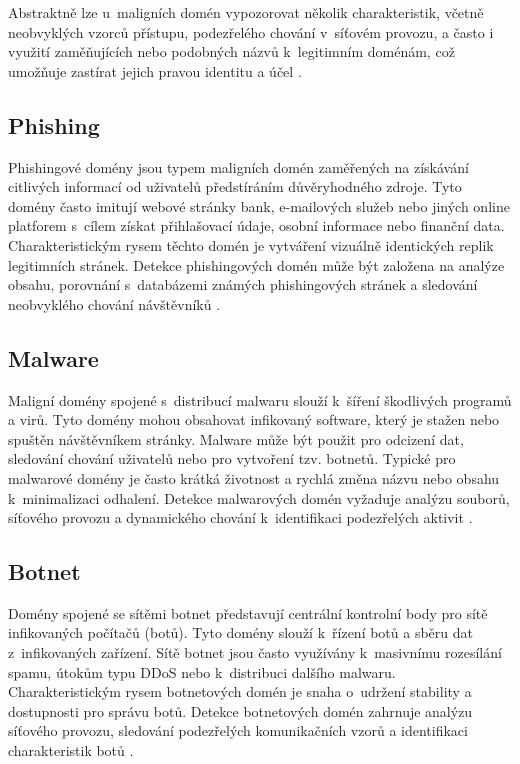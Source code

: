 Abstraktně lze u~maligních domén vypozorovat několik charakteristik, včetně neobvyklých vzorců přístupu, podezřelého chování v~síťovém provozu, a často i využití zaměňujících nebo podobných názvů k~legitimním doménám, což umožňuje zastírat jejich pravou identitu a účel \cite{perdisci2009detection}.



\subsection{Phishing}
Phishingové domény jsou typem maligních domén zaměřených na získávání citlivých informací od uživatelů předstíráním důvěryhodného zdroje. Tyto domény často imitují webové stránky bank, e-mailových služeb nebo jiných online platforem s~cílem získat přihlašovací údaje, osobní informace nebo finanční data. Charakteristickým rysem těchto domén je vytváření vizuálně identických replik legitimních stránek. Detekce phishingových domén může být založena na analýze obsahu, porovnání s~databázemi známých phishingových stránek a sledování neobvyklého chování návštěvníků \cite{moore-clayton}.

\subsection{Malware}
Maligní domény spojené s~distribucí malwaru slouží k~šíření škodlivých programů a virů. Tyto domény mohou obsahovat infikovaný software, který je stažen nebo spuštěn návštěvníkem stránky. Malware může být použit pro odcizení dat, sledování chování uživatelů nebo pro vytvoření tzv. botnetů. Typické pro malwarové domény je často krátká životnost a rychlá změna názvu nebo obsahu k~minimalizaci odhalení. Detekce malwarových domén vyžaduje analýzu souborů, síťového provozu a dynamického chování k~identifikaci podezřelých aktivit \cite{provos2007virtual}.

\subsection{Botnet}
Domény spojené se sítěmi botnet představují centrální kontrolní body pro sítě infikovaných počítačů (botů). Tyto domény slouží k~řízení botů a sběru dat z~infikovaných zařízení. Sítě botnet jsou často využívány k~masivnímu rozesílání spamu, útokům typu DDoS nebo k~distribuci dalšího malwaru. Charakteristickým rysem botnetových domén je snaha o~udržení stability a dostupnosti pro správu botů. Detekce botnetových domén zahrnuje analýzu síťového provozu, sledování podezřelých komunikačních vzorů a identifikaci charakteristik botů \cite{plohmann2016comprehensive}.

